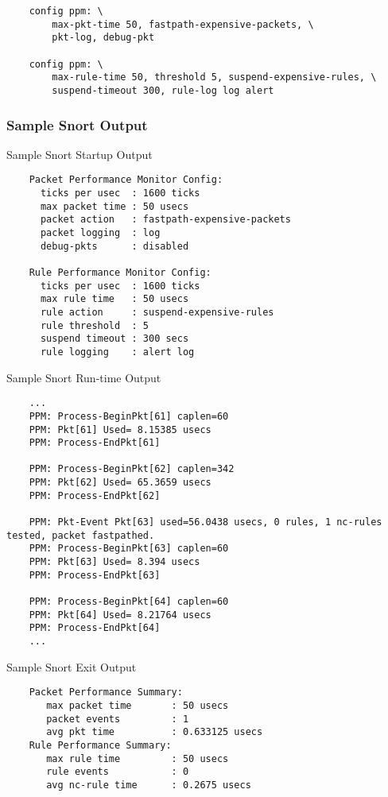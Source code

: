 \documentclass[english]{report}
\begin{document}
\begin{verbatim}
    config ppm: \
        max-pkt-time 50, fastpath-expensive-packets, \
        pkt-log, debug-pkt
    
    config ppm: \
        max-rule-time 50, threshold 5, suspend-expensive-rules, \
        suspend-timeout 300, rule-log log alert
\end{verbatim}

\subsubsection{Sample Snort Output}

Sample Snort Startup Output

\begin{verbatim}
    Packet Performance Monitor Config:
      ticks per usec  : 1600 ticks
      max packet time : 50 usecs
      packet action   : fastpath-expensive-packets
      packet logging  : log
      debug-pkts      : disabled
    
    Rule Performance Monitor Config:
      ticks per usec  : 1600 ticks
      max rule time   : 50 usecs
      rule action     : suspend-expensive-rules
      rule threshold  : 5 
      suspend timeout : 300 secs
      rule logging    : alert log 
\end{verbatim}

Sample Snort Run-time Output

\begin{verbatim}
    ...
    PPM: Process-BeginPkt[61] caplen=60
    PPM: Pkt[61] Used= 8.15385 usecs
    PPM: Process-EndPkt[61]
    
    PPM: Process-BeginPkt[62] caplen=342
    PPM: Pkt[62] Used= 65.3659 usecs
    PPM: Process-EndPkt[62]
    
    PPM: Pkt-Event Pkt[63] used=56.0438 usecs, 0 rules, 1 nc-rules tested, packet fastpathed.
    PPM: Process-BeginPkt[63] caplen=60
    PPM: Pkt[63] Used= 8.394 usecs
    PPM: Process-EndPkt[63]
    
    PPM: Process-BeginPkt[64] caplen=60
    PPM: Pkt[64] Used= 8.21764 usecs
    PPM: Process-EndPkt[64]
    ...
\end{verbatim}

Sample Snort Exit Output

\begin{verbatim}
    Packet Performance Summary:
       max packet time       : 50 usecs
       packet events         : 1
       avg pkt time          : 0.633125 usecs
    Rule Performance Summary:
       max rule time         : 50 usecs
       rule events           : 0
       avg nc-rule time      : 0.2675 usecs
\end{verbatim}
\end{document}
